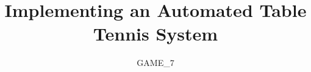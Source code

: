 \documentclass[11pt,a4paper,twocolumn]{report}
\title{Implementing an Automated Table Tennis System}
\subtitle{GAME\_7}
\begin{document}
	\preface
	
	
	
	
	
	

	
	

    \appendix
    \appendixpage
	

%	

	\backcover
\end{document}
